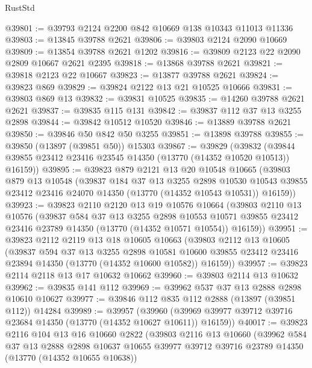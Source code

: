 \begin{lexlean}{RustStd}
\begin{coremodule}
@39801 := @39793 @2124 @2200 @842 @10669 @138 @10343 @11013 @11336
@39803 := @13845 @39788 @2621
@39806 := @39803 @2124 @2090 @10669
@39809 := @13854 @39788 @2621 @1202
@39816 := @39809 @2123 @22 @2090 @2809 @10667 @2621 @2395
@39818 := @13868 @39788 @2621
@39821 := @39818 @2123 @22 @10667
@39823 := @13877 @39788 @2621
@39824 := @39823 @869
@39829 := @39824 @2122 @13 @21 @10525 @10666
@39831 := @39803 @869 @13
@39832 := @39831 @10525
@39835 := @14260 @39788 @2621 @2621
@39837 := @39835 @115 @131
@39842 := @39837 @112 @37 @13 @3255 @2898
@39844 := @39842 @10512 @10520
@39846 := @13889 @39788 @2621
@39850 := @39846 @50 @842 @50 @3255
@39851 := @13898 @39788
@39855 := @39850 (@13897 (@39851 @50)) @15303
@39867 := @39829
    (@39832 (@39844 @39855 @23412 @23416 @23545 @14350 (@13770 (@14352 @10520 @10513)) @16159))
@39895 := @39823
    @879
    @2121
    @13
    @20
    @10548
    @10665
    (@39803
      @879
      @13
      @10548
      (@39837
        @184
        @37
        @13
        @3255
        @2898
        @10530
        @10543
        @39855
        @23412
        @23416
        @24070
        @14350
        (@13770 (@14352 @10543 @10531))
        @16159))
@39923 := @39823
    @2110
    @2120
    @13
    @19
    @10576
    @10664
    (@39803
      @2110
      @13
      @10576
      (@39837
        @584
        @37
        @13
        @3255
        @2898
        @10553
        @10571
        @39855
        @23412
        @23416
        @23789
        @14350
        (@13770 (@14352 @10571 @10554))
        @16159))
@39951 := @39823
    @2112
    @2119
    @13
    @18
    @10605
    @10663
    (@39803
      @2112
      @13
      @10605
      (@39837
        @594
        @37
        @13
        @3255
        @2898
        @10581
        @10600
        @39855
        @23412
        @23416
        @23894
        @14350
        (@13770 (@14352 @10600 @10582))
        @16159))
@39957 := @39823 @2114 @2118 @13 @17 @10632 @10662
@39960 := @39803 @2114 @13 @10632
@39962 := @39835 @141 @112
@39969 := @39962 @537 @37 @13 @2888 @2898 @10610 @10627
@39977 := @39846 @112 @835 @112 @2888 (@13897 (@39851 @112)) @14284
@39989 := @39957
    (@39960 (@39969 @39977 @39712 @39716 @23684 @14350 (@13770 (@14352 @10627 @10611)) @16159))
@40017 := @39823
    @2116
    @104
    @13
    @16
    @10660
    @2822
    (@39803
      @2116
      @13
      @10660
      (@39962
        @584
        @37
        @13
        @2888
        @2898
        @10637
        @10655
        @39977
        @39712
        @39716
        @23789
        @14350
        (@13770 (@14352 @10655 @10638))

\end{coremodule}
\end{lexlean}
